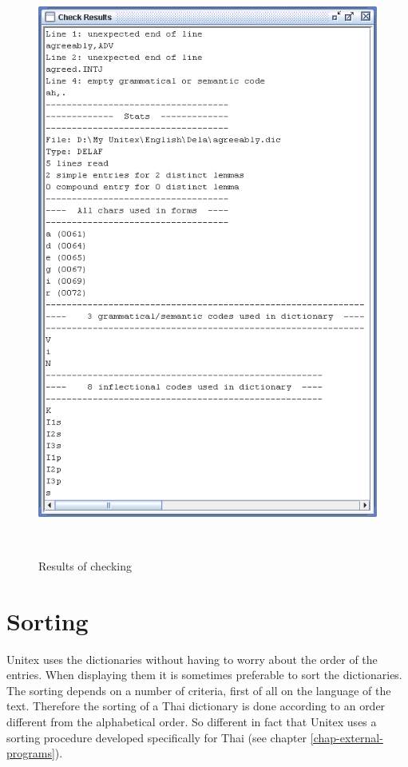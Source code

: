 \begin{figure}[!p]
\begin{center}
\includegraphics[height=19.4cm]{resources/img/fig3-4.png}
\caption{Results of checking\label{fig-dictionary-checking-results}}
\end{center}
\end{figure}


\section{Sorting}

Unitex uses the dictionaries without having to worry about the order of the
entries. When displaying them it is sometimes preferable to sort the
dictionaries. The sorting depends on a number of criteria, first of all on the
language of the text. Therefore the sorting of a Thai dictionary is done
according to an order different from the alphabetical order.  So different in
fact that Unitex uses a sorting procedure developed specifically for Thai (see
chapter \ref{chap-external-programs}).

